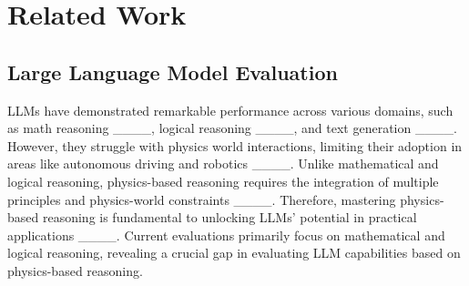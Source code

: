 \section{Related Work}
\subsection{Large Language Model Evaluation}
LLMs have demonstrated remarkable performance across various domains, such as math reasoning ____, logical reasoning ____, and text generation ____.
However, they struggle with physics world interactions, limiting their adoption in areas like autonomous driving and robotics ____.
Unlike mathematical and logical reasoning, physics-based reasoning requires the integration of multiple principles and physics-world constraints ____.
Therefore, mastering physics-based reasoning is fundamental to unlocking LLMs' potential in practical applications ____.
Current evaluations primarily focus on mathematical and logical reasoning, revealing a crucial gap in evaluating LLM capabilities based on physics-based reasoning.
